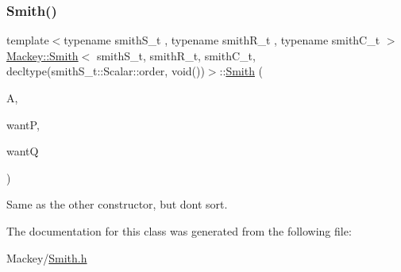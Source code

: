 \subsubsection{\texorpdfstring{Smith()}{Smith()}\hspace{0.1cm}{\footnotesize\ttfamily [2/2]}}
{\footnotesize\ttfamily template$<$typename smith\+S\+\_\+t , typename smith\+R\+\_\+t , typename smith\+C\+\_\+t $>$ \\
\hyperlink{classMackey_1_1Smith}{Mackey\+::\+Smith}$<$ smith\+S\+\_\+t, smith\+R\+\_\+t, smith\+C\+\_\+t, decltype(smith\+S\+\_\+t\+::\+Scalar\+::order, void())$>$\+::\hyperlink{classMackey_1_1Smith}{Smith} (\begin{DoxyParamCaption}\item[{const smith\+S\+\_\+t \&}]{A,  }\item[{bool}]{wantP,  }\item[{bool}]{wantQ }\end{DoxyParamCaption})\hspace{0.3cm}{\ttfamily [inline]}}



Same as the other constructor, but don\textquotesingle{}t sort. 



The documentation for this class was generated from the following file\+:\begin{DoxyCompactItemize}
\item 
Mackey/\hyperlink{Smith_8h}{Smith.\+h}\end{DoxyCompactItemize}
